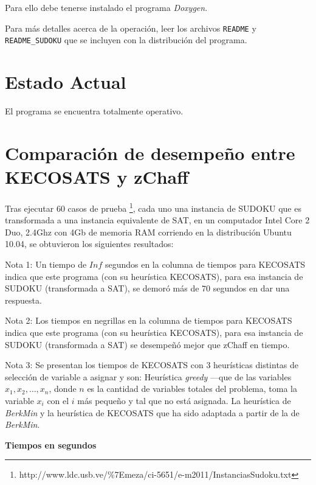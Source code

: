 \documentclass[12pt,lettersize,oneside]{article}
\begin{document}
Para ello debe tenerse instalado el programa \emph{Doxygen}.

Para más detalles acerca de la operación, leer los archivos {\tt README} y {\tt
  README\_SUDOKU} que se incluyen con la distribución del programa.
\section{Estado Actual}
El programa se encuentra totalmente operativo.

\section{Comparación de desempeño entre KECOSATS y zChaff}

Tras ejecutar $60$ casos de prueba
\footnote{http://www.ldc.usb.ve/\%7Emeza/ci-5651/e-m2011/InstanciasSudoku.txt},
cada uno una instancia de SUDOKU que es transformada a una instancia equivalente
de SAT, en un computador Intel Core 2 Duo, 2.4Ghz con 4Gb de memoria RAM
corriendo en la distribución Ubuntu 10.04, se
obtuvieron los siguientes resultados:

Nota 1: Un tiempo de $Inf$ segundos en la columna de tiempos para KECOSATS
indica que este programa (con su heurística KECOSATS), para esa instancia de
SUDOKU (transformada a SAT), se demoró más de $70$ segundos en dar una
respuesta.

Nota 2: Los tiempos en negrillas en la columna de tiempos para KECOSATS indica
que este programa (con su heurística KECOSATS), para esa instancia de SUDOKU
(transformada a SAT) se desempeñó mejor que zChaff en tiempo.

Nota 3: Se presentan los tiempos de KECOSATS con 3 heurísticas distintas de
selección de variable a asignar y son: Heurística \emph{greedy} ---que
de las variables $x_1,x_2,\ldots,x_n$, donde $n$ es la cantidad de variables
totales del problema, toma la variable $x_i$ con el $i$ más pequeño y tal que no
está asignada. La heurística de \emph{BerkMin} y la heurística de KECOSATS que
ha sido adaptada a partir de la de \emph{BerkMin}.
\begin{center}\textbf{ Tiempos en segundos}\end{center}\vspace{-2.5mm}

\end{document}
